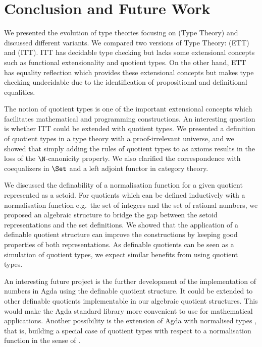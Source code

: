 \chapter{Conclusion and Future Work}

We presented the evolution of type theories focusing on \mltt (Type
Theory) and discussed different variants.  We compared two versions of
Type Theory: \ett (ETT) and \itt (ITT). ITT has decidable type
checking but lacks some extensional concepts such as functional
extensionality and quotient types. On the other hand, ETT has equality
reflection which provides these extensional concepts but makes type
checking undecidable due to the identification of propositional and
definitional equalities.


The notion of quotient types is one of the important extensional
concepts which facilitates mathematical and programming
constructions. An interesting question is whether ITT could be
extended with quotient types. We presented a definition of quotient
types in a type theory with a proof-irrelevant universe, and we showed
that simply adding the rules of quotient types to \itt as axioms
results in the loss of the $\N$-canonicity property. We also clarified
the correspondence with coequalizers in $\Set$ and a left adjoint
functor in category theory.


We discussed the definability of a normalisation function for a given
quotient represented as a setoid. For quotients which can be defined
inductively with a normalisation function e.g.\ the set of integers
and the set of rational numbers, we proposed an algebraic structure to
bridge the gap between the setoid representations and the set
definitions. We showed that the application of a definable quotient
structure can improve the constructions by keeping good properties of
both representations. As definable quotients can be seen as a
simulation of quotient types, we expect similar benefits from using
quotient types.

An interesting future project is the further development of the
implementation of numbers in Agda using the definable quotient
structure. It could be extended to other definable quotients
implementable in our algebraic quotient structures. This would make
the Agda standard library more convenient to use for mathematical
applications. Another possibility is the extension of Agda with
normalised types \cite{cou:01}, that is, building a special case of
quotient types with respect to a normalisation function in the sense
of .

